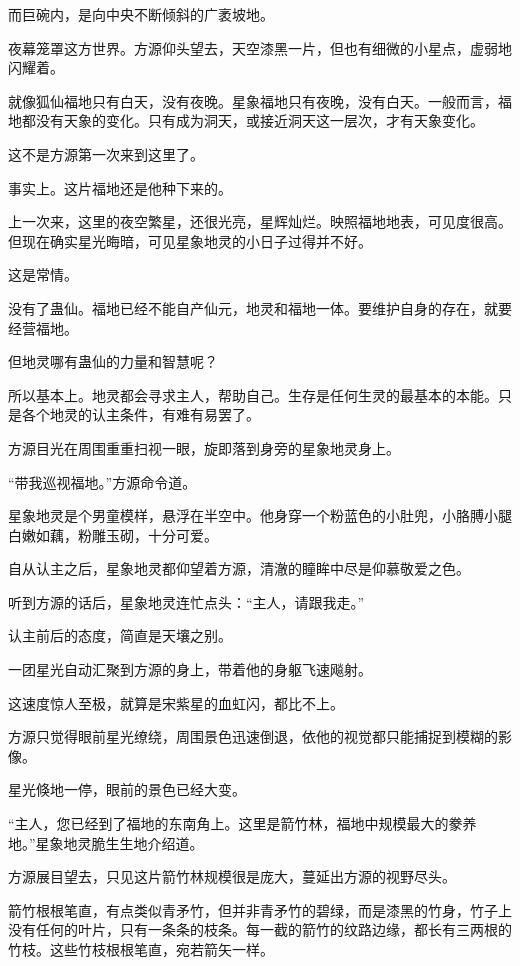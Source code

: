 \begin{this_body}
而巨碗内，是向中央不断倾斜的广袤坡地。

夜幕笼罩这方世界。方源仰头望去，天空漆黑一片，但也有细微的小星点，虚弱地闪耀着。

就像狐仙福地只有白天，没有夜晚。星象福地只有夜晚，没有白天。一般而言，福地都没有天象的变化。只有成为洞天，或接近洞天这一层次，才有天象变化。

这不是方源第一次来到这里了。

事实上。这片福地还是他种下来的。

上一次来，这里的夜空繁星，还很光亮，星辉灿烂。映照福地地表，可见度很高。但现在确实星光晦暗，可见星象地灵的小日子过得并不好。

这是常情。

没有了蛊仙。福地已经不能自产仙元，地灵和福地一体。要维护自身的存在，就要经营福地。

但地灵哪有蛊仙的力量和智慧呢？

所以基本上。地灵都会寻求主人，帮助自己。生存是任何生灵的最基本的本能。只是各个地灵的认主条件，有难有易罢了。

方源目光在周围重重扫视一眼，旋即落到身旁的星象地灵身上。

“带我巡视福地。”方源命令道。

星象地灵是个男童模样，悬浮在半空中。他身穿一个粉蓝色的小肚兜，小胳膊小腿白嫩如藕，粉雕玉砌，十分可爱。

自从认主之后，星象地灵都仰望着方源，清澈的瞳眸中尽是仰慕敬爱之色。

听到方源的话后，星象地灵连忙点头：“主人，请跟我走。”

认主前后的态度，简直是天壤之别。

一团星光自动汇聚到方源的身上，带着他的身躯飞速飚射。

这速度惊人至极，就算是宋紫星的血虹闪，都比不上。

方源只觉得眼前星光缭绕，周围景色迅速倒退，依他的视觉都只能捕捉到模糊的影像。

星光倏地一停，眼前的景色已经大变。

“主人，您已经到了福地的东南角上。这里是箭竹林，福地中规模最大的豢养地。”星象地灵脆生生地介绍道。

方源展目望去，只见这片箭竹林规模很是庞大，蔓延出方源的视野尽头。

箭竹根根笔直，有点类似青矛竹，但并非青矛竹的碧绿，而是漆黑的竹身，竹子上没有任何的叶片，只有一条条的枝条。每一截的箭竹的纹路边缘，都长有三两根的竹枝。这些竹枝根根笔直，宛若箭矢一样。


\end{this_body}
